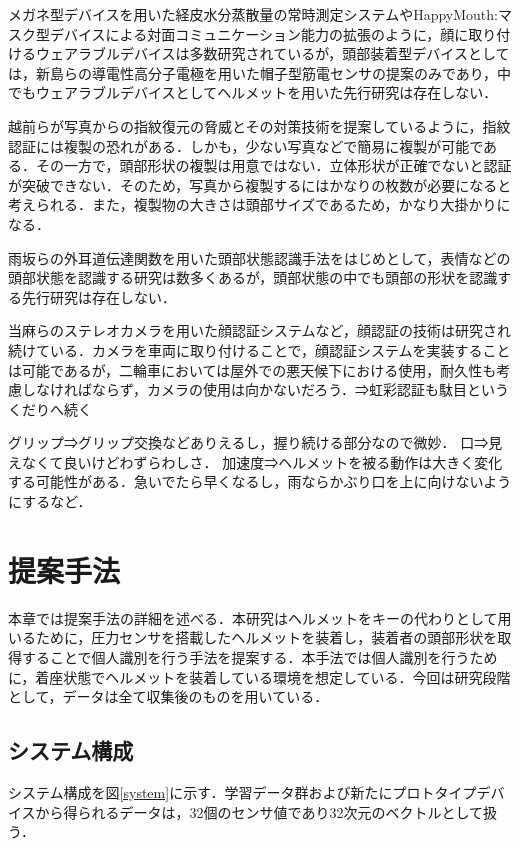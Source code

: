 \documentclass[Japanese]{dicomopapers}
\begin{document}
メガネ型デバイスを用いた経皮水分蒸散量の常時測定システム\cite{glasses}やHappyMouth:マスク型デバイスによる対面コミュニケーション能力の拡張\cite{happymouth}のように，顔に取り付けるウェアラブルデバイスは多数研究されているが，頭部装着型デバイスとしては，新島らの導電性高分子電極を用いた帽子型筋電センサの提案\cite{cap_sensor}のみであり，中でもウェアラブルデバイスとしてヘルメットを用いた先行研究は存在しない．

越前らが写真からの指紋復元の脅威とその対策技術\cite{finger_print}を提案しているように，指紋認証には複製の恐れがある．しかも，少ない写真などで簡易に複製が可能である．その一方で，頭部形状の複製は用意ではない．立体形状が正確でないと認証が突破できない．そのため，写真から複製するにはかなりの枚数が必要になると考えられる．また，複製物の大きさは頭部サイズであるため，かなり大掛かりになる．

雨坂らの外耳道伝達関数を用いた頭部状態認識手法\cite{head_from_ear}をはじめとして，表情などの頭部状態を認識する研究は数多くあるが，頭部状態の中でも頭部の形状を認識する先行研究は存在しない．

当麻らのステレオカメラを用いた顔認証システム\cite{face}など，顔認証の技術は研究され続けている．カメラを車両に取り付けることで，顔認証システムを実装することは可能であるが，二輪車においては屋外での悪天候下における使用，耐久性も考慮しなければならず，カメラの使用は向かないだろう．⇒虹彩認証も駄目というくだりへ続く

グリップ⇒グリップ交換などありえるし，握り続ける部分なので微妙．
口⇒見えなくて良いけどわずらわしさ．
加速度⇒ヘルメットを被る動作は大きく変化する可能性がある．急いでたら早くなるし，雨ならかぶり口を上に向けないようにするなど．

\section{提案手法}
本章では提案手法の詳細を述べる．本研究はヘルメットをキーの代わりとして用いるために，圧力センサを搭載したヘルメットを装着し，装着者の頭部形状を取得することで個人識別を行う手法を提案する．本手法では個人識別を行うために，着座状態でヘルメットを装着している環境を想定している．今回は研究段階として，データは全て収集後のものを用いている．

\subsection{システム構成}
システム構成を図\ref{system}に示す．学習データ群および新たにプロトタイプデバイスから得られるデータは，32個のセンサ値であり32次元のベクトルとして扱う．\par
\end{document}
